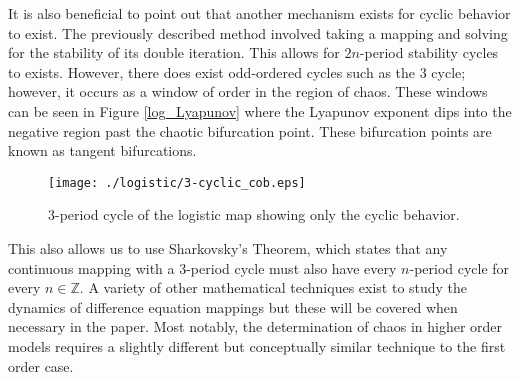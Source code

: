 It is also beneficial to point out that another mechanism exists for cyclic behavior to exist. The previously described method involved taking a mapping and solving for the stability of its double iteration. This allows for $2n$-period stability cycles to exists. However, there does exist odd-ordered cycles such as the $3$ cycle; however, it occurs as a window of order in the region of chaos. These windows can be seen in Figure \ref{log_Lyapunov} where the Lyapunov exponent dips into the negative region past the chaotic bifurcation point. These bifurcation points are known as tangent bifurcations.
\begin{figure}
    \centering
    \texttt{[image: ./logistic/3-cyclic\_cob.eps]}
    \caption{3-period cycle of the logistic map showing only the cyclic behavior.}
    \label{log_3-cyclic_cob}
\end{figure}
This also allows us to use Sharkovsky's Theorem, which states that any continuous mapping with a 3-period cycle must also have every $n$-period cycle for every $n\in\mathbb{Z}$.\autocite{Puu2003} A variety of other mathematical techniques exist to study the dynamics of difference equation mappings but these will be covered when necessary in the paper. Most notably, the determination of chaos in higher order models requires a slightly different but conceptually similar technique to the first order case.



